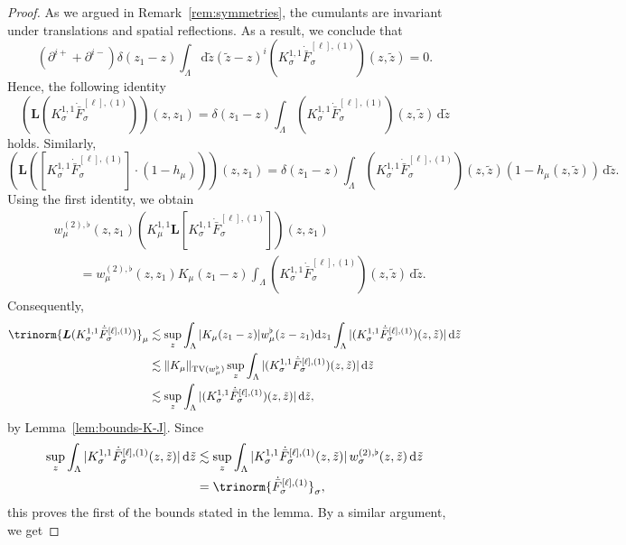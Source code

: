 \documentclass{article}
\numberwithin{equation}{section}
\newcommand{\mathd}{\mathrm{d}}
\theoremstyle{plain}
\theoremstyle{definition}
\begin{document}
\begin{proof}
  As we argued in Remark~\ref{rem:symmetries}, the cumulants are invariant under
  translations and spatial reflections. As a result, we conclude that
  \[ (\partial^{i+}  + \partial^{i-}) \delta (z_1 - z) \int_{\Lambda} \mathd
     \tilde{z}  (\tilde{z} - z)^i (K^{1, 1}_{\sigma}
     \dot{\bar{F}}_{\sigma}^{[\ell], (1)}) (z, \tilde{z}) = 0
     . \]
  Hence, the following identity
  \[ (\boldsymbol{L} (K^{1, 1}_{\sigma} \dot{\bar{F}}_{\sigma}^{[\ell], (1)}))
     (z, z_1) = \delta (z_1 - z) \int_{\Lambda} (K^{1, 1}_{\sigma}
     \dot{\bar{F}}_{\sigma}^{[\ell], (1)}) (z, \tilde{z})\,\mathd \tilde{z} \]
  holds. Similarly,
  \[ (\boldsymbol{L} ([K^{1, 1}_{\sigma} \dot{\bar{F}}_{\sigma}^{[\ell], (1)}]
     \cdot (1 - h_{\mu}))) (z, z_1) = \delta (z_1 - z) \int_{\Lambda} (K^{1,
     1}_{\sigma} \dot{\bar{F}}_{\sigma}^{[\ell], (1)}) (z, \tilde{z})  (1 -
     h_{\mu} (z, \tilde{z}))\,\mathd \tilde{z} . \]
  Using the first identity, we obtain
  \begin{align*}
     &w^{(2), \flat}_{\mu} (z, z_1)
     (K^{1, 1}_{\mu} \boldsymbol{L} [K^{1,
     1}_{\sigma} \dot{\bar{F}}_{\sigma}^{[\ell], (1)}]) (z, z_1)\\
     &\qquad = w^{(2), \flat}_{\mu} (z, z_1) K_{\mu} (z_1 - z)
     \int_{\Lambda} (K^{1, 1}_{\sigma}
     \dot{\bar{F}}_{\sigma}^{[\ell], (1)}) (z, \tilde{z}) \,\mathd \tilde{z} .
  \end{align*}
  Consequently,
  \begin{align*}
    \trinorm{ \boldsymbol{L} (K^{1, 1}_{\sigma}
    \dot{\bar{F}}_{\sigma}^{[\ell], (1)}) }_{\mu} &\lesssim 
    \sup_z \int_{\Lambda} | K_{\mu} (z_1 - z) | w_{\mu}^{\flat} (z - z_1)
    \mathd z_1 \int_{\Lambda} | (K^{1, 1}_{\sigma}
    \dot{\bar{F}}_{\sigma}^{[\ell], (1)}) (z, \tilde{z}) |\,\mathd \tilde{z}\\
 &\lesssim  \| K_{\mu} \|_{\operatorname{TV} (w_{\mu}^{\flat})} \sup_z
    \int_{\Lambda} | (K^{1, 1}_{\sigma} \dot{\bar{F}}_{\sigma}^{[\ell], (1)})
    (z, \tilde{z}) |\,\mathd \tilde{z}\\
 &\lesssim  \sup_z \int_{\Lambda} | (K^{1, 1}_{\sigma}
    \dot{\bar{F}}_{\sigma}^{[\ell], (1)}) (z, \tilde{z}) |\,\mathd \tilde{z},
  \end{align*}
  by Lemma~\ref{lem:bounds-K-J}. Since
  \begin{align*} \sup_z \int_{\Lambda} | K^{1, 1}_{\sigma} \dot{\bar{F}}_{\sigma}^{[\ell],
     (1)} (z, \tilde{z}) |\,\mathd \tilde{z} 
     &\lesssim
      \sup_z \int_{\Lambda} |
     K^{1, 1}_{\sigma} \dot{\bar{F}}_{\sigma}^{[\ell], (1)} (z, \tilde{z}) |\,
     w^{(2), \flat}_{\sigma} (z, \tilde{z})\, \mathd \tilde{z} 
     \\
     &= \trinorm{
     \dot{\bar{F}}_{\sigma}^{[\ell], (1)} }_{\sigma},
  \end{align*}
  this proves the first of the bounds stated in the lemma. By a similar
  argument, we get
  

\end{proof}
\end{document}
